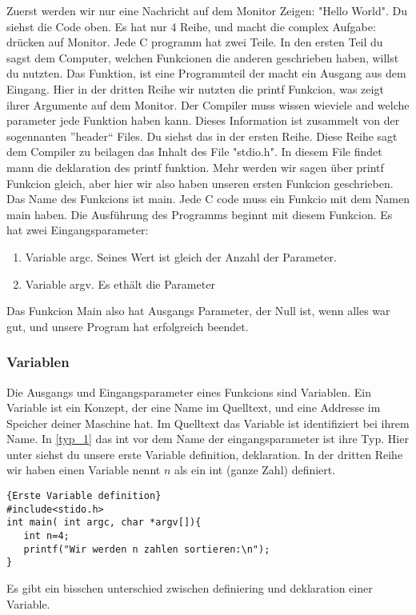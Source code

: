 \documentclass{article}[12pt]
\begin{document}
Zuerst werden wir nur eine Nachricht auf dem Monitor Zeigen: "Hello World". Du siehst die Code oben. Es hat nur 4 Reihe, und
macht die complex Aufgabe: drücken auf Monitor. Jede C programm hat zwei Teile. In den ersten Teil du sagst dem Computer, welchen 
Funkcionen die anderen geschrieben haben, willst du nutzten.  Das Funktion, ist eine Programmteil der macht ein Ausgang aus dem Eingang. 
Hier in der dritten Reihe wir nutzten die printf Funkcion, was zeigt ihrer Argumente auf dem Monitor. Der Compiler muss wissen
wieviele and welche parameter jede Funktion haben kann. Dieses Information ist zusammelt von der sogennanten ''header`` Files. 
Du siehst das in der ersten Reihe. Diese Reihe sagt dem Compiler zu beilagen das Inhalt des File "stdio.h". In diesem File
findet mann die deklaration des printf funktion. Mehr werden wir sagen über printf Funkcion gleich, aber hier wir also
haben unseren ersten Funkcion geschrieben. Das Name des Funkcions ist main. Jede C code muss ein Funkcio mit dem Namen main 
haben. Die Ausführung des Programms beginnt mit diesem Funkcion. Es hat zwei Eingangsparameter:
\begin{enumerate}
\item Variable argc. Seines Wert ist gleich der Anzahl der Parameter.
\item Variable argv. Es ethält die Parameter
\end{enumerate}
Das Funkcion Main also hat Ausgangs Parameter, der Null ist, wenn alles war gut, und unsere Program hat erfolgreich 
beendet.

\subsubsection{Variablen}
Die Ausgangs und Eingangsparameter eines Funkcions sind Variablen.
Ein Variable ist ein Konzept, der eine Name im Quelltext, und eine Addresse im Speicher deiner Maschine hat. 
Im Quelltext das Variable ist identifiziert bei ihrem Name. In \ref{typ_1} das int vor dem Name der eingangsparameter
ist ihre Typ. Hier unter siehst du unsere erste Variable definition, deklaration. In der dritten Reihe wir haben einen Variable
nennt $n$ als ein int (ganze Zahl) definiert. 
\begin{lstlisting}{Erste Variable definition}
#include<stido.h>
int main( int argc, char *argv[]){
   int n=4;
   printf("Wir werden n zahlen sortieren:\n");
}
\end{lstlisting}

Es gibt ein bisschen unterschied zwischen definiering und deklaration einer Variable.
\end{document}
